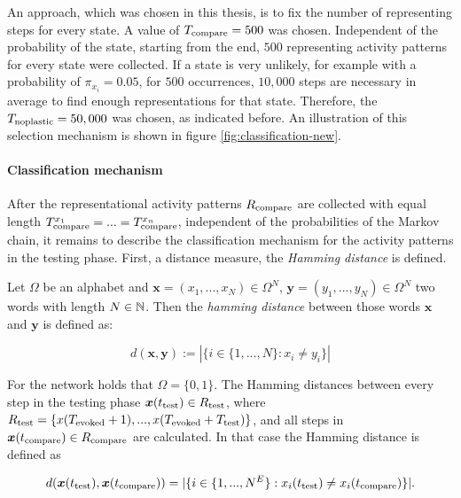 An approach, which was chosen in this thesis, is to fix the number of representing steps for every state. A value of $T_{\text{compare}} = 500$ was chosen. Independent of the probability of the state, starting from the end, $500$ representing activity patterns for every state were collected. If a state is very unlikely, for example with a probability of $\pi_{x_i} = 0.05$, for $500$ occurrences, $10,000$ steps are necessary in average to find enough representations for that state. Therefore, the $T_{\text{noplastic}} = 50,000$ was chosen, as indicated before. An illustration of this selection mechanism is shown in figure \ref{fig:classification-new}.

\paragraph{Classification mechanism}

After the representational activity patterns $R_{\text{compare}}$ are collected with equal length $T_{\text{compare}}^{x_1} = ... = T_{\text{compare}}^{x_n}$, independent of the probabilities of the Markov chain, it remains to describe the classification mechanism for the activity patterns in the testing phase. First, a distance measure, the \emph{Hamming distance} is defined.

\begin{definition}
Let $\Omega$ be an alphabet and $\bm x = (x_1, ..., x_N) \in \Omega^N$, $\bm y = (y_1, ..., y_N) \in \Omega^N$ two words with length $N \in \mathbb{N}$. Then the \emph{hamming distance} between those words $\bm x$ and $\bm y$ is defined as:

\begin{equation}
\label{eq:hamming}
d(\bm x, \bm y) := |\{i \in \{1, ..., N\} : x_i \neq y_i\}|
\end{equation}
\end{definition}

For the network holds that $\Omega = \{0,1\}$. The Hamming distances between every step in the testing phase $\bm x(t_{\text{test}}) \in R_{\text{test}}$, where $R_{\text{test}} = \{ x(T_{\text{evoked}} + 1), ..., x(T_{\text{evoked}} + T_{\text{test}}) \}$, and all steps in $\bm x(t_{\text{compare}}) \in R_{\text{compare}}$  are calculated. In that case the Hamming distance is defined as

\begin{equation}
\label{eq:hamming-applied}
d(\bm x(t_{\text{test}}), \bm x(t_{\text{compare}})) = |\{ i \in \{ 1, ..., N^E \} : x_i(t_{\text{test}}) \neq  x_i(t_{\text{compare}}) \}|.
\end{equation}

